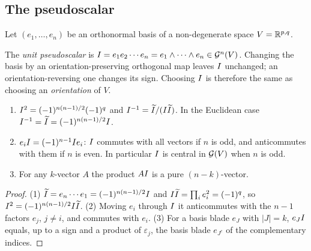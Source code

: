 \subsection{The pseudoscalar}

Let $(e_1,\dots,e_n)$ be an orthonormal basis of a non-degenerate space $V=\mathbb{R}^{p,q}$.

\begin{definition}[Pseudoscalar]
The \emph{unit pseudoscalar} is $I=e_1e_2\cdots e_n=e_1\wedge\cdots\wedge e_n\in\mathcal{G}^n(V)$. Changing the basis by an orientation-preserving orthogonal map leaves $I$ unchanged; an orientation-reversing one changes its sign. Choosing $I$ is therefore the same as choosing an \emph{orientation} of $V$.
\end{definition}

\begin{proposition}\label{prop:pss}
\begin{enumerate}
  \item $I^2=(-1)^{n(n-1)/2}(-1)^q$ and $I^{-1}=\widetilde{I}/(I\widetilde{I})$. In the Euclidean case $I^{-1}=\widetilde{I}=(-1)^{n(n-1)/2}I$.
  \item $e_iI=(-1)^{n-1}I e_i$: $I$ commutes with all vectors if $n$ is odd, and anticommutes with them if $n$ is even. In particular $I$ is central in $\mathcal{G}(V)$ when $n$ is odd.
  \item For any $k$-vector $A$ the product $AI$ is a pure $(n-k)$-vector.
\end{enumerate}
\end{proposition}
\begin{proof}
(1) $\widetilde{I}=e_n\cdots e_1=(-1)^{n(n-1)/2}I$ and $I\widetilde{I}=\prod_i e_i^2=(-1)^q$, so $I^2=(-1)^{n(n-1)/2}I\widetilde{I}$. (2) Moving $e_i$ through $I$ it anticommutes with the $n-1$ factors $e_j$, $j\neq i$, and commutes with $e_i$. (3) For a basis blade $e_J$ with $|J|=k$, $e_JI$ equals, up to a sign and a product of $\varepsilon_j$, the basis blade $e_{J^c}$ of the complementary indices.
\end{proof}
